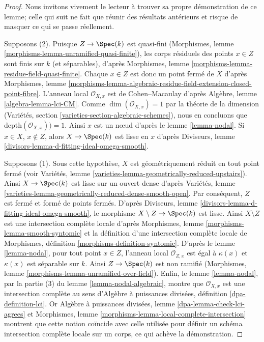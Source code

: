 \begin{proof}
Nous invitons vivement le lecteur à trouver sa propre démonstration de ce lemme; celle qui suit ne fait que réunir des résultats antérieurs et risque de masquer ce qui se passe réellement.

\medskip\noindent
Supposons (2). Puisque $Z \to \Spec(k)$ est quasi-fini (Morphismes, lemme \ref{morphisms-lemma-unramified-quasi-finite}), les corps résiduels des points $x \in Z$ sont finis sur $k$ (et séparables), d'après Morphismes, lemme \ref{morphisms-lemma-residue-field-quasi-finite}. Chaque $x \in Z$ est donc un point fermé de $X$ d'après Morphismes, lemme \ref{morphisms-lemma-algebraic-residue-field-extension-closed-point-fibre}. L'anneau local $\mathcal{O}_{X, x}$ est de Cohen--Macaulay d'après Algèbre, lemme \ref{algebra-lemma-lci-CM}. Comme $\dim(\mathcal{O}_{X, x}) = 1$ par la théorie de la dimension (Variétés, section \ref{varieties-section-algebraic-schemes}), nous en concluons que $\text{depth}(\mathcal{O}_{X, x})) = 1$. Ainsi $x$ est un nœud d'après le lemme \ref{lemma-nodal}. Si $x \in X$, $x \not \in Z$, alors $X \to \Spec(k)$ est lisse en $x$ d'après Diviseurs, lemme \ref{divisors-lemma-d-fitting-ideal-omega-smooth}.

\medskip\noindent
Supposons (1). Sous cette hypothèse, $X$ est géométriquement réduit en tout point fermé (voir Variétés, lemme \ref{varieties-lemma-geometrically-reduced-upstairs}). Ainsi $X \to \Spec(k)$ est lisse sur un ouvert dense d'après Variétés, lemme \ref{varieties-lemma-geometrically-reduced-dense-smooth-open}. Par conséquent, $Z$ est fermé et formé de points fermés. D'après Diviseurs, lemme \ref{divisors-lemma-d-fitting-ideal-omega-smooth}, le morphisme $X \setminus Z \to \Spec(k)$ est lisse. Ainsi $X \setminus Z$ est une intersection complète locale d'après Morphismes, lemme \ref{morphisms-lemma-smooth-syntomic} et la définition d'une intersection complète locale de Morphismes, définition \ref{morphisms-definition-syntomic}. D'après le lemme \ref{lemma-nodal}, pour tout point $x \in Z$, l'anneau local $\mathcal{O}_{Z, x}$ est égal à $\kappa(x)$ et $\kappa(x)$ est séparable sur $k$. Ainsi $Z \to \Spec(k)$ est non ramifié (Morphismes, lemme \ref{morphisms-lemma-unramified-over-field}). Enfin, le lemme \ref{lemma-nodal}, par la partie (3) du lemme \ref{lemma-nodal-algebraic}, montre que $\mathcal{O}_{X, x}$ est une intersection complète au sens d'Algèbre à puissances divisées, définition \ref{dpa-definition-lci}. Or Algèbre à puissances divisées, lemme \ref{dpa-lemma-check-lci-agrees} et Morphismes, lemme \ref{morphisms-lemma-local-complete-intersection} montrent que cette notion coïncide avec celle utilisée pour définir un schéma intersection complète locale sur un corps, ce qui achève la démonstration.
\end{proof}

